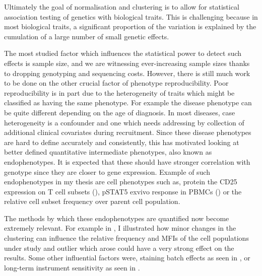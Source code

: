 Ultimately the goal of normalisation and clustering is to allow for statistical association testing of genetics with biological traits.
This is challenging because in most biological traits, a significant proportion of the variation is explained by the cumulation of a large number of small genetic effects.

The most studied factor which influences the statistical power to detect such effects is sample size, and we are witnessing ever-increasing sample sizes thanks to dropping genotyping and sequencing costs.
However, there is still much work to be done on the other crucial factor of phenotype reproducibility.
Poor reproducibility is in part due to the heterogeneity of traits which might be classified as having the same phenotype.
For example the disease phenotype can be quite different depending on the age of diagnosis.
In most diseases, case heterogeneity is a confounder and one which needs addressing by collection of additional clinical covariates during recruitment.
Since these disease phenotypes are hard to define accurately and consistently,
this has motivated looking at better defined quantitative intermediate phenotypes, also known as endophenotypes.
It is expected that these should have stronger correlation with genotype since they are closer to gene expression.
Example of such endophenotypes in my thesis are cell phenotypes such as, protein the CD25 expression on T cell subsets (), pSTAT5 exvivo response in \glspl{PBMC} () or the relative cell subset frequency over parent cell population.

The methods by which these endophenotypes are quantified now become extremely relevant.
For example in , I illustrated how minor changes in the clustering can influence the relative frequency and MFIs of the cell populations under study and outlier which arose could have a very strong effect on the results.
Some other influential factors were, staining batch effects as seen in , or long-term instrument sensitivity as seen in .

